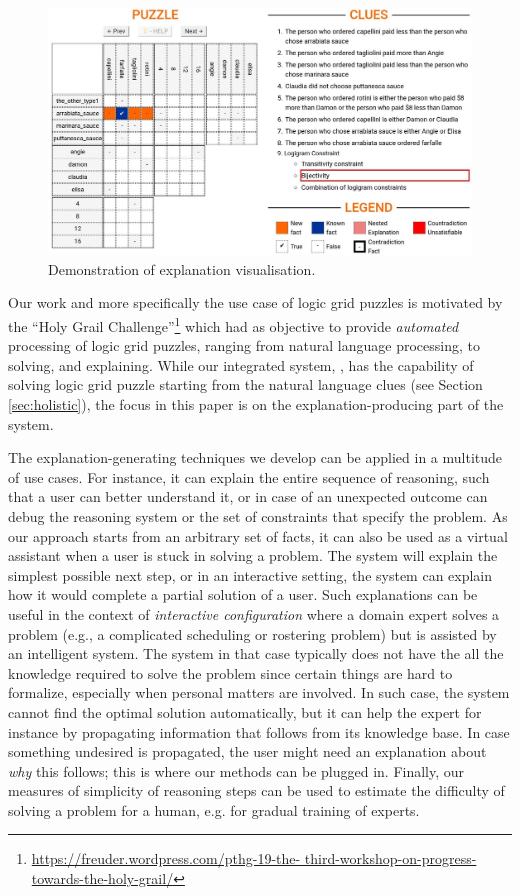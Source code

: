 \begin{figure}[h]
\centering
\includegraphics[width=\textwidth]{figures/introduction.jpeg}
\caption{Demonstration of explanation visualisation.}
\label{fig:zebrascreen}
\end{figure}

Our work and more specifically the use case of logic grid puzzles is motivated by the ``Holy Grail Challenge''\footnote{\url{https://freuder.wordpress.com/pthg-19-the- third-workshop-on-progress-towards-the-holy-grail/}} which had as objective to provide \textit{automated} processing of logic grid puzzles, ranging from natural language processing, to solving, and explaining.
While our integrated system, \ourtool, has the capability of solving logic grid puzzle starting from the natural language clues (see Section \ref{sec:holistic}), the focus in this paper is on the explanation-producing part of the system.

The explanation-generating techniques we develop can be applied in a multitude of use cases. 
For instance, it can explain the entire sequence of reasoning, such that a user can better understand it, or in case of an unexpected outcome can debug the reasoning system or the set of constraints that specify the problem. 
As our approach starts from an arbitrary set of facts, it can also be used as a virtual assistant when a user is stuck in solving a problem.
The system will explain the simplest possible next step, or in an interactive setting, the system can explain how it would complete a partial solution of a user. Such explanations can be useful in the context of  \emph{interactive configuration} \cite{felfernig2014knowledge} where a domain expert solves a problem (e.g., a complicated scheduling or rostering problem) but is assisted by an intelligent system. 
The system in that case typically does not have the all the knowledge required to solve the problem since certain things are hard to formalize, especially when personal matters are involved. In such case, the system cannot find the optimal solution automatically, but it can help the expert for instance by propagating information that follows from its knowledge base. In case something undesired is propagated, the user might need an explanation about \emph{why} this follows; this is where our methods can be plugged in.
Finally, our measures of simplicity of reasoning steps can be used to estimate the difficulty of solving a problem for a human, e.g. for gradual training of experts.

